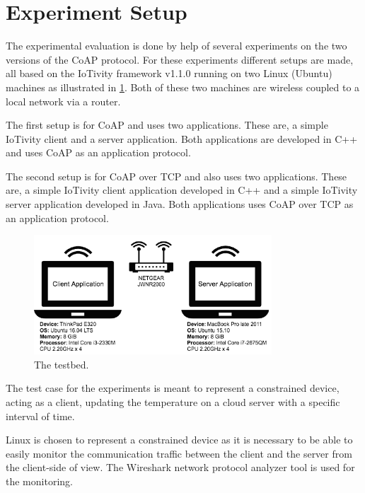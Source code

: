 \section{Experiment Setup}\label{sec:experimentsetup}
The experimental evaluation is done by help of several experiments on the two versions of the CoAP protocol. For these experiments different setups are made, all based on the IoTivity framework v1.1.0 running on two Linux (Ubuntu) machines as illustrated in \figurename \ref{fig:setup}. Both of these two machines are wireless coupled to a local network via a router. 

The first setup is for CoAP and uses two applications. These are, a simple IoTivity client and a server application. Both applications are developed in C++ and uses CoAP as an application protocol.

The second setup is for CoAP over TCP and also uses two applications. These are, a simple IoTivity client application developed in C++ and a simple IoTivity server application developed in Java. Both applications uses CoAP over TCP as an application protocol.

\begin{figure}[bht]
	\centering
	\includegraphics[width=3.5in]{gfx/setupa}
	\caption{The testbed.}
	\label{fig:setup}
\end{figure}

The test case for the experiments is meant to represent a constrained device, acting as a client, updating the temperature on a cloud server with a specific interval of time. 

Linux is chosen to represent a constrained device as it is necessary to be able to easily monitor the communication traffic between the client and the server from the client-side of view.
The Wireshark network protocol analyzer tool is used for the monitoring.





